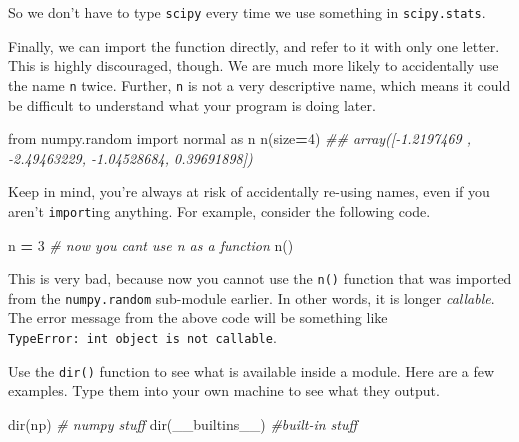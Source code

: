 \documentclass[
  12pt,
  krantz2]{krantz}
\makeatletter
\newenvironment{Shaded}{\begin{snugshade}}{\end{snugshade}}
\newcommand{\BuiltInTok}[1]{#1}
\newcommand{\CommentTok}[1]{\textcolor[rgb]{0.37,0.37,0.37}{\textit{#1}}}
\newcommand{\DecValTok}[1]{\textcolor[rgb]{0.06,0.06,0.06}{#1}}
\newcommand{\ImportTok}[1]{#1}
\newcommand{\NormalTok}[1]{#1}
\newcommand{\OperatorTok}[1]{\textcolor[rgb]{0.43,0.43,0.43}{\textbf{#1}}}
\newenvironment{kframe}{%
\medskip{}
\setlength{\fboxsep}{.8em}
 \def\at@end@of@kframe{}%
 \ifinner\ifhmode%
  \def\at@end@of@kframe{\end{minipage}}%
  \begin{minipage}{\columnwidth}%
 \fi\fi%
 \def\FrameCommand##1{\hskip\@totalleftmargin \hskip-\fboxsep
 \colorbox{shadecolor}{##1}\hskip-\fboxsep
     \hskip-\linewidth \hskip-\@totalleftmargin \hskip\columnwidth}%
 \MakeFramed {\advance\hsize-\width
   \@totalleftmargin\z@ \linewidth\hsize
   \@setminipage}}%
 {\par\unskip\endMakeFramed%
 \at@end@of@kframe}
\renewenvironment{Shaded}{\begin{kframe}}{\end{kframe}}
\makeatother
\begin{document}
So we don't have to type \texttt{scipy} every time we use something in \texttt{scipy.stats}.

Finally, we can import the function directly, and refer to it with only one letter. This is highly discouraged, though. We are much more likely to accidentally use the name \texttt{n} twice. Further, \texttt{n} is not a very descriptive name, which means it could be difficult to understand what your program is doing later.

\begin{Shaded}
\begin{Highlighting}[]
\ImportTok{from}\NormalTok{ numpy.random }\ImportTok{import}\NormalTok{ normal }\ImportTok{as}\NormalTok{ n}
\NormalTok{n(size}\OperatorTok{=}\DecValTok{4}\NormalTok{)}
\CommentTok{\#\# array([{-}1.2197469 , {-}2.49463229, {-}1.04528684,  0.39691898])}
\end{Highlighting}
\end{Shaded}

Keep in mind, you're always at risk of accidentally re-using names, even if you aren't \texttt{import}ing anything. For example, consider the following code.

\begin{Shaded}
\begin{Highlighting}[]
\NormalTok{n }\OperatorTok{=} \DecValTok{3} \CommentTok{\# now you can\textquotesingle{}t use n as a function }
\NormalTok{n()   }
\end{Highlighting}
\end{Shaded}

This is very bad, because now you cannot use the \texttt{n()} function that was imported from the \texttt{numpy.random} sub-module earlier. In other words, it is longer \emph{callable}. The error message from the above code will be something like \texttt{TypeError:\ \textquotesingle{}int\textquotesingle{}\ object\ is\ not\ callable}.

Use the \texttt{dir()} function to see what is available inside a module. Here are a few examples. Type them into your own machine to see what they output.

\begin{Shaded}
\begin{Highlighting}[]
\BuiltInTok{dir}\NormalTok{(np) }\CommentTok{\# numpy stuff}
\BuiltInTok{dir}\NormalTok{(\_\_builtins\_\_) }\CommentTok{\#built{-}in stuff}
\end{Highlighting}
\end{Shaded}
\end{document}
